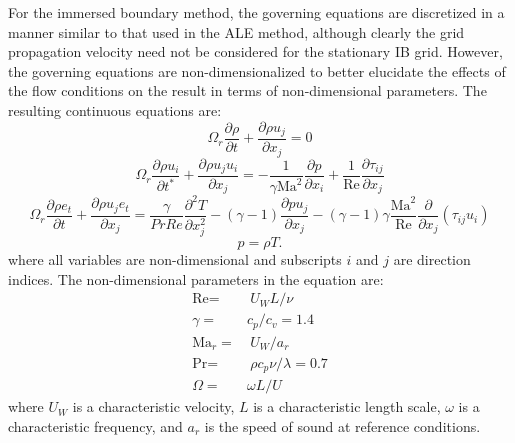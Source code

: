 \documentclass{article}
\newcommand{\pder}[2][]{\frac{\partial#1}{\partial#2}}
\newcommand{\sder}[2][]{\frac{\partial^{2}#1}{\partial#2^{2}}}
\begin{document}
For the immersed boundary method, the governing equations are discretized in a manner similar to that used in the ALE method, although clearly the grid propagation velocity need not be considered for the stationary IB grid. However, the governing equations are non-dimensionalized to better elucidate the effects of the flow conditions on the result in terms of non-dimensional parameters. The resulting continuous equations are:
%
\begin{equation}
\label{continuity-non}
\Omega_r \pder[\rho]{t} +  \pder[\rho u_j]{x_j} = 0
\end{equation}
%
\begin{equation}
\label{momentum-non}
\Omega_r \pder[\rho u_i]{t^*} + \pder[\rho u_j u_i]{x_j} = -\frac{1}{\gamma \textrm{Ma}^2}\pder[p]{x_i} + \frac{1}{\textrm{Re}} \pder[\tau_{ij}]{x_j}
\end{equation}
%
\begin{equation}
\label{temp-non}
\Omega_r \pder[\rho e_t]{t} + \pder[\rho u_j e_t]{x_j} = 
\frac{\gamma}{PrRe}\sder[T]{x_j} - (\gamma -1) \pder[p u_j]{x_j}
- (\gamma -1)\gamma \frac{\textrm{Ma}^2}{\textrm{Re}} \pder{x_j} \left( \tau_{ij}u_i  \right)
\end{equation}
%
\begin{equation}
\label{idg-non}
p = \rho T.
\end{equation}
%
where all variables are non-dimensional and subscripts $i$ and $j$ are direction indices. The non-dimensional parameters in the equation are:
\begin{equation}
\begin{aligned}
\textrm{Re} =& \ U_W L / \nu \\
\gamma =& c_p/c_v = 1.4\\
\textrm{Ma}_r =&\ U_W/a_r \\
\textrm{Pr} =&\ \rho c_p \nu / \lambda = 0.7 \\
\Omega =& \omega L / U
\end{aligned}
\end{equation}
where $U_W$ is a characteristic velocity, $L$ is a characteristic length scale, $\omega$ is a characteristic frequency, and $a_r$ is the speed of sound at reference conditions. 
\end{document}
